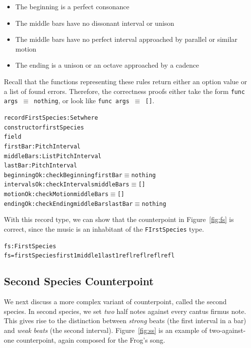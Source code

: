 \begin{itemize}
  \item The beginning is a perfect consonance
  \item The middle bars have no dissonant interval or unison
  \item The middle bars have no perfect interval approached by
    parallel or similar motion
  \item The ending is a unison or an octave approached by a cadence
\end{itemize}

\noindent Recall that the functions representing these rules return
either an option value or a list of found errors.
Therefore, the correctness proofs either take the form
\texttt{func args $\equiv$ nothing}, or look like
\texttt{func args $\equiv$ []}.

\begin{alltt}
record FirstSpecies : Set where
  constructor firstSpecies
  field
    firstBar    : PitchInterval
    middleBars  : List PitchInterval
    lastBar     : PitchInterval
    beginningOk : checkBeginning firstBar \(\equiv\) nothing
    intervalsOk : checkIntervals middleBars \(\equiv\) []
    motionOk    : checkMotion middleBars \(\equiv\) []
    endingOk    : checkEnding middleBars lastBar \(\equiv\) nothing
\end{alltt}

With this record type, we can show that the counterpoint in
Figure~\ref{fig:fs} is correct, since the music is an inhabitant of
the \texttt{FIrstSpecies} type.

\begin{alltt}
fs : FirstSpecies
fs = firstSpecies first1 middle1 last1 refl refl refl refl
\end{alltt}

\subsection{Second Species Counterpoint}
\label{sec:cp:ss}

\SS

We next discuss a more complex variant of counterpoint, called the
second species.
In second species, we set \emph{two} half notes against every cantus
firmus note.
This gives rise to the distinction between \emph{strong} beats (the
first interval in a bar) and \emph{weak beats} (the second interval).
Figure~\ref{fig:ss} is an example of two-against-one counterpoint,
again composed for the Frog's song.

